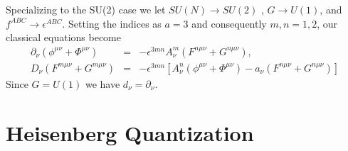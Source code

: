 \documentclass[a4paper,aps,showpacs]{revtex4}
\begin{document}
Specializing to the SU(2) case we let $SU(N) \rightarrow SU(2)$ ,
$G \rightarrow U(1)$, and $f^{ABC} \rightarrow \epsilon ^{ABC}$.
Setting the indices as $a = 3$ and consequently $m,n = 1,2$,
our classical equations become
\begin{eqnarray}
  \partial_\nu \left( \phi ^{\mu\nu} +\Phi^{\mu\nu} \right) & = &
  -\epsilon^{3mn} A^m_\nu
  \left(
  F^{n\mu\nu} + G^{n\mu\nu}
  \right),
\label{sec3-10a}\\
  D_\nu \left( F^{m\mu\nu} +G^{m\mu\nu} \right) & = &
  -\epsilon^{3mn}
  \left[
  A^n_\nu \left( \phi ^{\mu\nu} + \Phi^{\mu\nu} \right) -
  a_\nu \left( F^{n\mu\nu} + G^{n\mu\nu} \right)
  \right]
\label{sec3-10b}
\end{eqnarray}
Since $G=U(1)$ we have $d_\nu = \partial_\nu$.

\section{Heisenberg Quantization}
\end{document}
